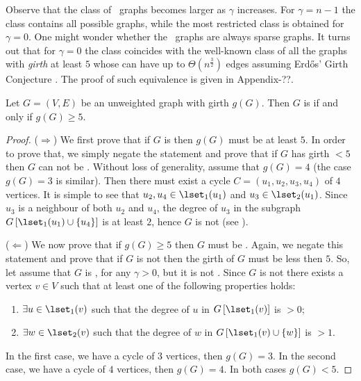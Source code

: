 
Observe that the class of \gammaok\ graphs becomes larger as $\gamma$ increases. For $\gamma=n-1$ the class contains all possible graphs, while the most restricted class is obtained for $\gamma=0$. One might wonder whether the \gammaok\ graphs are always sparse graphs. It turns out that for $\gamma=0$ the class coincides with the well-known class of all the graphs with \emph{girth} at least $5$ whose can have up to $\Theta(n^{\frac{3}{2}})$ edges assuming Erdős' Girth Conjecture \cite{??}. The proof of such equivalence is given in Appendix-??.


\begin{lemma}\label{lemma:girth_rev}
    Let $G = (V,E)$ be an unweighted graph with girth $g(G)$.
    Then $G$ is  if and only if $g(G) \geq 5$.
\end{lemma}
\begin{proof}
    ($\Rightarrow$) We first prove that if $G$ is  then $g(G)$ must be at least $5$.
    In order to prove that, we simply negate the statement and prove that if $G$ has girth $<5$ then $G$ can not be .
    Without loss of generality, assume that $g(G) = 4$ (the case $g(G) = 3$ is similar).
    Then there must exist a cycle $C = (u_1, u_2, u_3, u_4)$ of $4$ vertices.
    It is simple to see that $u_2,u_4 \in \lset_1(u_1)$ and $u_3 \in \lset_2(u_1)$.
    Since $u_3$ is a neighbour of both $u_2$ and $u_4$, the degree of $u_3$ in the subgraph $G\left[\lset_1(u_1) \cup \{u_4\} \right]$ is at least $2$, hence $G$ is not  (see ).

    \noindent ($\Leftarrow$) We now prove that if $g(G) \geq 5$ then $G$ must be .
    Again, we negate this statement and prove that if $G$ is not  then the girth of $G$ must be less then $5$.
    So, let assume that $G$ is \gammaok, for any $\gamma > 0$, but it is not .
    Since $G$ is not  there exists a vertex $v \in V$ such that at least one of the following properties holds:
    \begin{enumerate}
         \item $\exists u \in \lset_1(v)$ such that the degree of $u$ in $G\left[ \lset_1(v) \right]$ is $> 0$;
        \item $\exists w \in \lset_2(v)$ such that the degree of $w$ in $G\left[ \lset_1(v) \cup \{ w \} \right]$ is $> 1$.
    \end{enumerate}
    In the first case, we have a cycle of $3$ vertices, then $g(G) = 3$.
    In the second case, we have a cycle of $4$ vertices, then $g(G) = 4$.
    In both cases $g(G) < 5$.
\end{proof}


